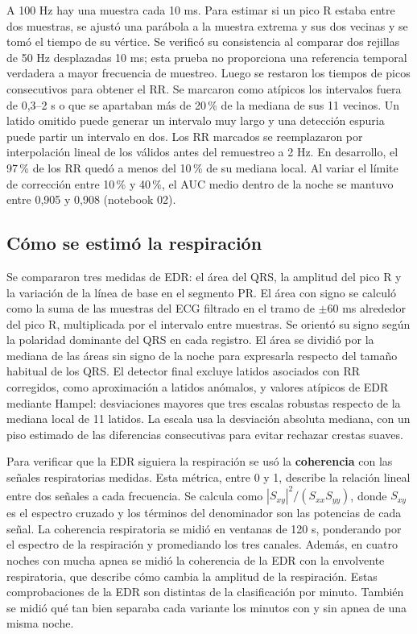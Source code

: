 \documentclass[10pt,a4paper]{article}
\begin{document}
A 100 Hz hay una muestra cada 10 ms. Para estimar si un pico R estaba entre dos muestras, se ajustó una parábola a la muestra extrema y sus dos vecinas y se tomó el tiempo de su vértice. Se verificó su consistencia al comparar dos rejillas de 50 Hz desplazadas 10 ms; esta prueba no proporciona una referencia temporal verdadera a mayor frecuencia de muestreo. Luego se restaron los tiempos de picos consecutivos para obtener el RR. Se marcaron como atípicos los intervalos fuera de 0,3--2 s o que se apartaban más de 20\,\% de la mediana de sus 11 vecinos. Un latido omitido puede generar un intervalo muy largo y una detección espuria puede partir un intervalo en dos. Los RR marcados se reemplazaron por interpolación lineal de los válidos antes del remuestreo a 2 Hz. En desarrollo, el 97\,\% de los RR quedó a menos del 10\,\% de su mediana local. Al variar el límite de corrección entre 10\,\% y 40\,\%, el AUC medio dentro de la noche se mantuvo entre 0,905 y 0,908 (notebook 02).

\subsection{Cómo se estimó la respiración}
Se compararon tres medidas de EDR: el área del QRS, la amplitud del pico R y la variación de la línea de base en el segmento PR. El área con signo se calculó como la suma de las muestras del ECG filtrado en el tramo de $\pm60$ ms alrededor del pico R, multiplicada por el intervalo entre muestras. Se orientó su signo según la polaridad dominante del QRS en cada registro. El área se dividió por la mediana de las áreas sin signo de la noche para expresarla respecto del tamaño habitual de los QRS. El detector final excluye latidos asociados con RR corregidos, como aproximación a latidos anómalos, y valores atípicos de EDR mediante Hampel: desviaciones mayores que tres escalas robustas respecto de la mediana local de 11 latidos. La escala usa la desviación absoluta mediana, con un piso estimado de las diferencias consecutivas para evitar rechazar crestas suaves.

Para verificar que la EDR siguiera la respiración se usó la \textbf{coherencia} con las señales respiratorias medidas. Esta métrica, entre 0 y 1, describe la relación lineal entre dos señales a cada frecuencia. Se calcula como $|S_{xy}|^2/(S_{xx}S_{yy})$, donde $S_{xy}$ es el espectro cruzado y los términos del denominador son las potencias de cada señal. La coherencia respiratoria se midió en ventanas de 120 s, ponderando por el espectro de la respiración y promediando los tres canales. Además, en cuatro noches con mucha apnea se midió la coherencia de la EDR con la envolvente respiratoria, que describe cómo cambia la amplitud de la respiración. Estas comprobaciones de la EDR son distintas de la clasificación por minuto. También se midió qué tan bien separaba cada variante los minutos con y sin apnea de una misma noche.
\end{document}
